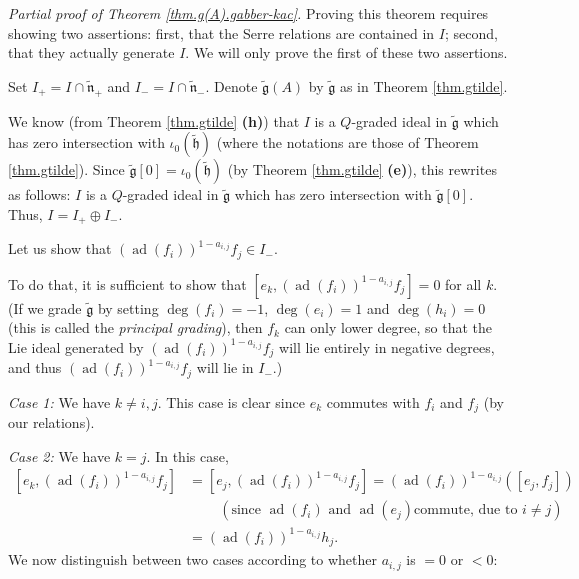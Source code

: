 \documentclass[etingof-lie.tex]{subfiles}
\begin{document}
\textit{Partial proof of Theorem \ref{thm.g(A).gabber-kac}.} Proving this
theorem requires showing two assertions: first, that the Serre relations are
contained in $I$; second, that they actually generate $I$. We will only prove
the first of these two assertions.

Set $I_{+}=I\cap\widetilde{\mathfrak{n}}_{+}$ and $I_{-}=I\cap
\widetilde{\mathfrak{n}}_{-}$. Denote $\widetilde{\mathfrak{g}}\left(
A\right)  $ by $\widetilde{\mathfrak{g}}$ as in Theorem \ref{thm.gtilde}.

We know (from Theorem \ref{thm.gtilde} \textbf{(h)}) that $I$ is a $Q$-graded
ideal in $\widetilde{\mathfrak{g}}$ which has zero intersection with
$\iota_{0}\left(  \widetilde{\mathfrak{h}}\right)  $ (where the notations are
those of Theorem \ref{thm.gtilde}). Since $\widetilde{\mathfrak{g}}\left[
0\right]  =\iota_{0}\left(  \widetilde{\mathfrak{h}}\right)  $ (by Theorem
\ref{thm.gtilde} \textbf{(e)}), this rewrites as follows: $I$ is a $Q$-graded
ideal in $\widetilde{\mathfrak{g}}$ which has zero intersection with
$\widetilde{\mathfrak{g}}\left[  0\right]  $. Thus, $I=I_{+}\oplus I_{-}$.

Let us show that $\left(  \operatorname*{ad}\left(  f_{i}\right)  \right)
^{1-a_{i,j}}f_{j}\in I_{-}$.

To do that, it is sufficient to show that $\left[  e_{k},\left(
\operatorname*{ad}\left(  f_{i}\right)  \right)  ^{1-a_{i,j}}f_{j}\right]  =0$
for all $k$. (If we grade $\widetilde{\mathfrak{g}}$ by setting $\deg\left(
f_{i}\right)  =-1$, $\deg\left(  e_{i}\right)  =1$ and $\deg\left(
h_{i}\right)  =0$ (this is called the \textit{principal grading}), then
$f_{k}$ can only lower degree, so that the Lie ideal generated by $\left(
\operatorname*{ad}\left(  f_{i}\right)  \right)  ^{1-a_{i,j}}f_{j}$ will lie
entirely in negative degrees, and thus $\left(  \operatorname*{ad}\left(
f_{i}\right)  \right)  ^{1-a_{i,j}}f_{j}$ will lie in $I_{-}$.)

\textit{Case 1:} We have $k\neq i,j$. This case is clear since $e_{k}$
commutes with $f_{i}$ and $f_{j}$ (by our relations).

\textit{Case 2:} We have $k=j$. In this case,
\begin{align*}
\left[  e_{k},\left(  \operatorname*{ad}\left(  f_{i}\right)  \right)
^{1-a_{i,j}}f_{j}\right]   &  =\left[  e_{j},\left(  \operatorname*{ad}\left(
f_{i}\right)  \right)  ^{1-a_{i,j}}f_{j}\right]  =\left(  \operatorname*{ad}%
\left(  f_{i}\right)  \right)  ^{1-a_{i,j}}\left(  \left[  e_{j},f_{j}\right]
\right) \\
&  \ \ \ \ \ \ \ \ \ \ \left(  \text{since }\operatorname*{ad}\left(
f_{i}\right)  \text{ and }\operatorname*{ad}\left(  e_{j}\right)  \text{
commute, due to }i\neq j\right) \\
&  =\left(  \operatorname*{ad}\left(  f_{i}\right)  \right)  ^{1-a_{i,j}}%
h_{j}.
\end{align*}
We now distinguish between two cases according to whether $a_{i,j}$ is $=0$ or
$<0$:
\end{document}
